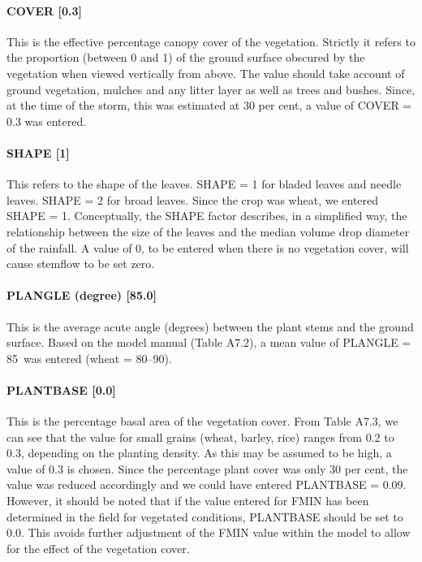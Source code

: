  
\paragraph{COVER [0.3]}
This is the effective percentage canopy cover of the vegetation. Strictly it
refers to the proportion (between 0 and 1) of the ground surface obscured by the
vegetation when viewed vertically from above. The value should take account of
ground vegetation, mulches and any litter layer as well as trees and bushes.
Since, at the time of the storm, this was estimated at 30 per cent, a value of
COVER = 0.3 was entered.
 
\paragraph{SHAPE [1]}
This refers to the shape of the leaves. SHAPE = 1 for bladed leaves and needle
leaves. SHAPE = 2 for broad leaves. Since the crop was wheat, we entered SHAPE =
1. Conceptually, the SHAPE factor describes, in a simplified way, the
relationship between the size of the leaves and the median volume drop diameter
of the rainfall. A value of 0, to be entered when there is no vegetation cover,
will cause stemflow to be set zero.

\paragraph{PLANGLE (degree) [85.0]}
This is the average acute angle (degrees) between the plant stems and the
ground surface. Based on the model manual (Table A7.2), a mean value of PLANGLE
= 85\textdegree\ was entered (wheat = 80--90).
 
\paragraph{PLANTBASE [0.0]}
This is the percentage basal area of the vegetation cover. From Table A7.3, we
can see that the value for small grains (wheat, barley, rice) ranges from 0.2 to
0.3, depending on the planting density. As this may be assumed to be high, a
value of 0.3 is chosen. Since the percentage plant cover was only 30 per cent,
the value was reduced accordingly and we could have entered PLANTBASE = 0.09.
However, it should be noted that if the value entered for FMIN has been
determined in the field for vegetated conditions, PLANTBASE should be set to
0.0. This avoids further adjustment of the FMIN value within the model to allow
for the effect of the vegetation cover.
 
